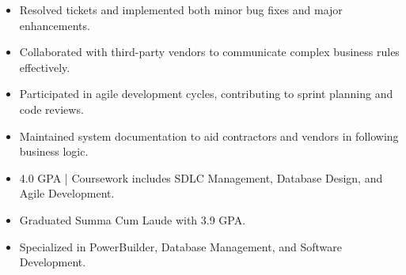 \par\smallskip
\noindent
\begin{minipage}{20cm}
  \begin{minipage}{9.75cm}
    \begin{itemize}
      \item Resolved tickets and implemented both minor bug fixes and major enhancements.
      \item Collaborated with third-party vendors to communicate complex business rules effectively.
    \end{itemize}
  \end{minipage}
  \hfill
  \begin{minipage}{9.75cm}
    \begin{itemize}
      \item Participated in agile development cycles, contributing to sprint planning and code reviews.
      \item Maintained system documentation to aid contractors and vendors in following business logic.
    \end{itemize}
  \end{minipage}
\end{minipage}
\par\smallskip
\divider

\begin{itemize}
  \item 4.0 GPA | Coursework includes SDLC Management, Database Design, and Agile Development.
\end{itemize}
\divider

\begin{itemize}
  \item Graduated Summa Cum Laude with 3.9 GPA.
  \item Specialized in PowerBuilder, Database Management, and Software Development.
\end{itemize}

\noindent
\begin{minipage}{20cm}
\end{minipage}


